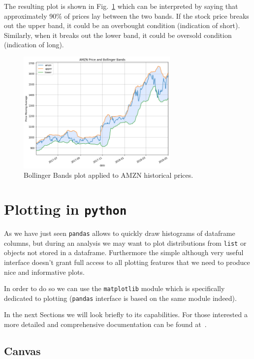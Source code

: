 The resulting plot is shown in Fig.~\ref{fig:bollinger_bands} which can be interpreted by saying that approximately 90\% of prices lay between the two bands. If the stock price breaks out the upper band, it could be an overbought condition (indication of short). Similarly, when it breaks out the lower band, it could be oversold condition (indication of long). 

\begin{figure}[htb]
	\centering
	\includegraphics[width=0.7\textwidth]{figures/bollinger_bands}
	\caption{Bollinger Bands plot applied to AMZN historical prices.}
	\label{fig:bollinger_bands}
\end{figure}

\section{Plotting in \texttt{python}}\label{plotting-in-python}

As we have just seen \texttt{pandas} allows to quickly draw histograms of dataframe columns, but during an analysis we may want to plot distributions from \texttt{list} or objects not stored in a dataframe. Furthermore the simple although very useful interface doesn't grant full access to all plotting features that we need to produce nice and informative plots.

In order to do so we can use the \texttt{matplotlib} module which is specifically dedicated to plotting (\texttt{pandas} interface is based on the same module indeed). 

In the next Sections we will look briefly to its capabilities. For those interested a more detailed and comprehensive documentation can be found at~\cite{matplotlib}.

\subsection{Canvas}\label{canvas}

